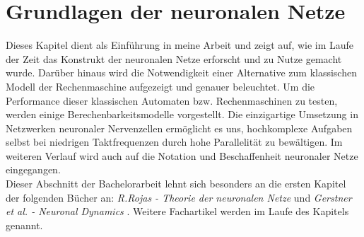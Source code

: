 %
\chapter{Grundlagen der neuronalen Netze}
\label{chap:neuro}
%
	Dieses Kapitel dient als Einführung in meine Arbeit und zeigt auf, wie im Laufe der Zeit das Konstrukt der neuronalen Netze erforscht und zu Nutze gemacht wurde. Darüber hinaus wird die Notwendigkeit einer Alternative zum klassischen Modell der Rechenmaschine aufgezeigt und genauer beleuchtet. Um die Performance dieser klassischen Automaten bzw. Rechenmaschinen zu testen, werden einige Berechenbarkeitsmodelle vorgestellt. Die einzigartige Umsetzung in Netzwerken neuronaler Nervenzellen ermöglicht es uns, hochkomplexe Aufgaben selbst bei niedrigen Taktfrequenzen durch hohe Parallelität zu bewältigen. Im weiteren Verlauf wird auch auf die Notation und Beschaffenheit neuronaler Netze eingegangen. \\
	Dieser Abschnitt der Bachelorarbeit lehnt sich besonders an die ersten Kapitel der folgenden Bücher an: \textit{R.Rojas - Theorie der neuronalen Netze} \cite{TheorieNeuro} und \textit{Gerstner et al. - Neuronal Dynamics} \cite{NeuronalDynamics}. Weitere Fachartikel werden im Laufe des Kapitels genannt.

